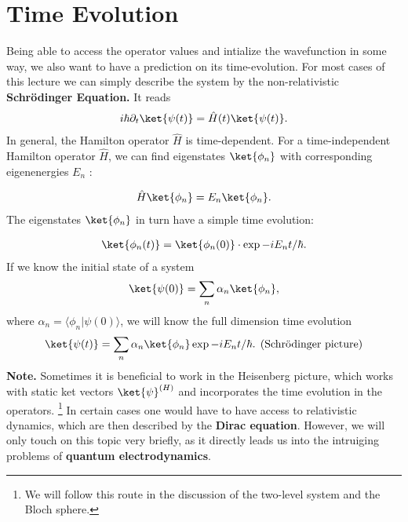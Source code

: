 \section{Time Evolution}
Being able to access the operator values and intialize the wavefunction in some way, we also want to have a prediction on its time-evolution. For most cases of this lecture we can simply describe the system by the non-relativistic \textbf{Schrödinger Equation.} It reads
\begin{align}
i\hbar\partial_t\ket{\psi(t)}=\hat{H}(t)\ket{\psi(t)}.
\end{align}
In general, the Hamilton operator $\hat{H}$ is time-dependent. For a time-independent Hamilton operator $\hat{H}$, we can find eigenstates $\ket{\phi_n}$ with corresponding eigenenergies $E_n$ :

\begin{align}
\hat{H}\ket{\phi_n}=E_n\ket{\phi_n}.
\end{align}
The eigenstates $\ket{\phi_n}$ in turn have a simple time evolution:

\begin{align}
    \ket{\phi_n(t)}=\ket{\phi_n(0)}\cdot \exp{-i E_nt/\hbar}.
\end{align}
If we know the initial state of a system
\begin{align}
\ket{\psi(0)}=\sum_n \alpha_n\ket{\phi_n},
\end{align}
where $\alpha_n=\langle\phi_n | \psi(0)\rangle$, we will know the full dimension time evolution
\begin{align}
\ket{\psi(t)}=\sum_n\alpha_n\ket{\phi_n}\exp{-i E_n t/\hbar}. \;\, \text{(Schrödinger picture)}
\end{align}
\textbf{Note.} Sometimes it is beneficial to work in the Heisenberg picture, which works with static ket vectors $\ket{\psi}^{(H)}$ and incorporates the time evolution in the operators. \footnote{We will follow this route in the discussion of the two-level system and the Bloch sphere.}
In certain cases one would have to have access to relativistic dynamics, which are then described by the \textbf{Dirac equation}. However, we will only touch on this topic very briefly, as it directly leads us into the intruiging problems of \textbf{quantum electrodynamics}.

